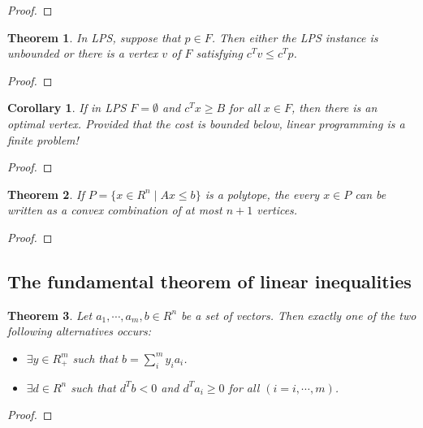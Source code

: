 \documentclass[11pt]{article} %
\theoremstyle{plain}%
\newtheorem{thm}{Theorem}[section]
\newtheorem*{cor}{Corollary}
\theoremstyle{definition}
\theoremstyle{remark}
\begin{document}
\begin{proof}

\end{proof}

\begin{thm}
In LPS, suppose that $p\in F$. Then either the LPS instance is unbounded or there is 
a vertex $v$ of $F$ satisfying $c^T v \leq c^T p$. 
\end{thm}

\begin{proof}

\end{proof}

\begin{cor}
If in LPS $F = \emptyset$ and $c^T x \geq B$ for all $x \in F$, then there is an 
optimal vertex. Provided that the cost is bounded below, linear programming is a finite
problem! 
\end{cor}

\begin{proof}

\end{proof}

\begin{thm}
If $P = \{ x \in R^n \mid Ax \leq b \}$ is a polytope, the every $x \in P$ can be written 
as a convex combination of at most $n+1$ vertices. 
\end{thm}

\begin{proof}

\end{proof}

\subsection{The fundamental theorem of linear inequalities}

\begin{thm}
Let $a_1, \cdots, a_m, b \in R^n$ be a set of vectors. Then exactly one of 
the two following alternatives occurs:
\begin{itemize}
\item[(I)] $\exists y \in R^m_+$ such that $b = \sum^m_i y_i a_i$. 
\item[(II)] $\exists d \in R^n$ such that $d^Tb < 0$ and $d^Ta_i \geq 0$ for all 
$(i = i, \cdots, m)$. 
\end{itemize}
\end{thm}

\begin{proof}

\end{proof}
\end{document}

